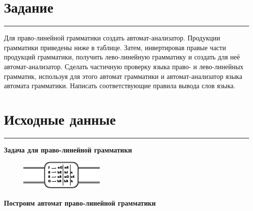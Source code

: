 \documentclass[a4paper, 14pt]{extarticle}
\begin{document}

\section*{Задание}\vspace{-20pt}\rule{\linewidth}{0.1mm}

Для право-линейной грамматики создать автомат-анализатор. 
Продукции грамматики приведены ниже в таблице. Затем, инвертировав 
правые части продукций грамматики, получить лево-линейную грамматику 
и создать для неё автомат-анализатор. Сделать частичную проверку языка 
право- и лево-линейных грамматик, используя для этого автомат грамматики и 
автомат-анализатор языка автомата грамматики. Написать соответствующие 
правила вывода слов языка.

\section*{Исходные данные}\vspace{-20pt}\rule{\linewidth}{0.1mm}

\begin{center}
  \fontsize{17.28pt}{20.736pt}\selectfont 
  \bfseries
  Задача для право-линейной грамматики
\end{center}

\vspace{-5pt}

\begin{figure}[h]
  \centering
  \includegraphics[page=1, scale=6]{graphics/data2}
\end{figure}


\vspace{-5pt}

\begin{center}
  \fontsize{17.28pt}{20.736pt}\selectfont 
  \bfseries
  Построим автомат право-линейной грамматики
\end{center}
\end{document}
